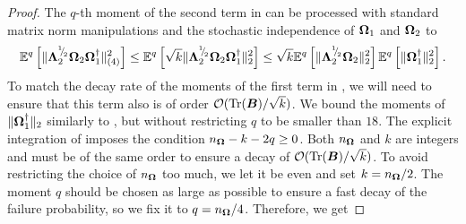 \begin{proof}
    \color{black}
    The $q$-th moment of the second term in  can be processed with standard matrix norm manipulations and the stochastic independence of $\boldsymbol{\Omega}_1$ and $\boldsymbol{\Omega}_2$ to
    \begin{equation}
        \mathbb{E}^{q}\left[ \lVert \mtx{\Lambda}_2^{\sfrac{1}{2}} \mtx{\Omega}_2 \mtx{\Omega}_1^{\dagger} \rVert _{(4)}^2 \right]
        \leq \mathbb{E}^{q}\left[ \sqrt{k} \lVert \mtx{\Lambda}_2^{\sfrac{1}{2}} \mtx{\Omega}_2 \mtx{\Omega}_1^{\dagger} \rVert _2^2 \right]%
        \leq \sqrt{k} \mathbb{E}^{q}\left[ \lVert \mtx{\Lambda}_2^{\sfrac{1}{2}} \mtx{\Omega}_2 \rVert _2^2\right] \mathbb{E}^{q}\left[ \lVert \mtx{\Omega}_1^{\dagger} \rVert _2^2  \right].%
        \label{equ:nystrom-proof-processed-tail}
    \end{equation}
    To match the decay rate of the moments of the first term in , we will need to ensure that this term also is of order $\mathcal{O}(\operatorname{Tr}(\boldsymbol{B}) / \sqrt{k})$. We bound the moments of $\lVert \boldsymbol{\Omega}_1^{\dagger} \rVert _2$ similarly to \cite[Lemma B.3]{tropp-2023-randomized-algorithms}, but without restricting $q$ to be smaller than $18$. The explicit integration of \cite[Equation B.7]{tropp-2023-randomized-algorithms} imposes the condition $n_{\boldsymbol{\Omega}} - k - 2q \geq 0$. Both $n_{\boldsymbol{\Omega}}$ and $k$ are integers and must be of the same order to ensure a decay of $\mathcal{O}(\operatorname{Tr}(\boldsymbol{B}) / \sqrt{k})$. To avoid restricting the choice of $n_{\boldsymbol{\Omega}}$ too much, we let it be even and set $k = n_{\boldsymbol{\Omega}}/2$. The moment $q$ should be chosen as large as possible to ensure a fast decay of the failure probability, so we fix it to $q = n_{\boldsymbol{\Omega}}/4$. Therefore, we get

\end{proof}
